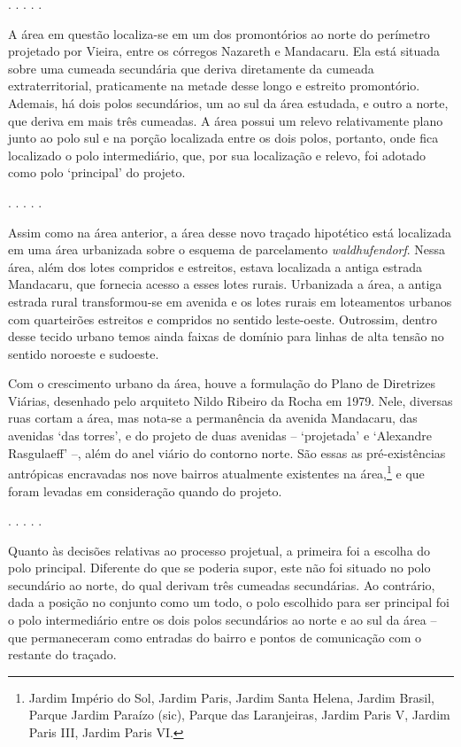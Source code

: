 \documentclass[12pt, a4paper]{book} %
\begin{document}
        \begin{center}
            . . . . .
        \end{center}  
        A área em questão localiza-se em um dos promontórios ao norte do perímetro projetado por Vieira, entre os córregos Nazareth e Mandacaru. Ela está situada sobre uma cumeada secundária que deriva diretamente da cumeada extraterritorial, praticamente na metade desse longo e estreito promontório. Ademais, há dois polos secundários, um ao sul da área estudada, e outro a norte, que deriva em mais três cumeadas. A área possui um relevo relativamente plano junto ao polo sul e na porção localizada entre os dois polos, portanto, onde fica localizado o polo intermediário, que, por sua localização e relevo, foi adotado como polo `principal' do projeto. 

        \begin{center}
            . . . . .
        \end{center} 
        Assim como na área anterior, a área desse novo traçado hipotético está localizada em uma área urbanizada sobre o esquema de parcelamento \textit{waldhufendorf}. Nessa área, além dos lotes compridos e estreitos, estava localizada a antiga estrada Mandacaru, que fornecia acesso a esses lotes rurais. Urbanizada a área, a antiga estrada rural transformou-se em avenida e os lotes rurais em loteamentos urbanos com quarteirões estreitos e compridos no sentido leste-oeste. Outrossim, dentro desse tecido urbano temos ainda faixas de domínio para linhas de alta tensão no sentido noroeste e sudoeste.

        Com o crescimento urbano da área, houve a formulação do Plano de Diretrizes Viárias, desenhado pelo arquiteto Nildo Ribeiro da Rocha em 1979. Nele, diversas ruas cortam a área, mas nota-se a permanência da avenida Mandacaru, das avenidas `das torres', e do projeto de duas avenidas – `projetada' e `Alexandre Rasgulaeff' –, além do anel viário do contorno norte.
        São essas as pré-existências antrópicas encravadas nos nove bairros atualmente existentes na área,\footnote[30]{Jardim Império do Sol, Jardim Paris, Jardim Santa Helena, Jardim Brasil, Parque Jardim Paraízo (sic), Parque das Laranjeiras, Jardim Paris V, Jardim Paris III, Jardim Paris VI.} e que foram levadas em consideração quando do projeto.

        \begin{center}
            . . . . .
        \end{center} 
        Quanto às decisões relativas ao processo projetual, a primeira foi a escolha do polo principal. Diferente do que se poderia supor, este não foi situado no polo secundário ao norte, do qual derivam três cumeadas secundárias. Ao contrário, dada a posição no conjunto como um todo, o polo escolhido para ser principal foi o polo intermediário entre os dois polos secundários ao norte e ao sul da área – que permaneceram como entradas do bairro e pontos de comunicação com o restante do traçado.
        
\end{document}
